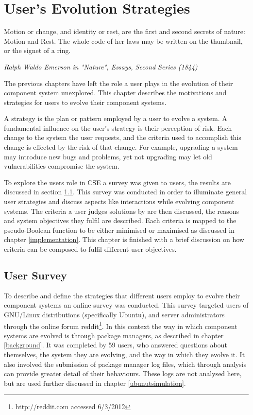 \chapter{User's Evolution Strategies}
\label{strategies}
\epigraph{Motion or change, and identity or rest, are the first and second secrets of nature: Motion and Rest. 
The whole code of her laws may be written on the thumbnail, or the signet of a ring.}
{\textit{Ralph Waldo Emerson in "Nature", Essays, Second Series (1844)}}
The previous chapters have left the role a user plays in the evolution of their component system unexplored.
This chapter describes the motivations and strategies for users to evolve their component systems.

A strategy is the plan or pattern employed by a user to evolve a system.
A fundamental influence on the user's strategy is their perception of risk.
Each change to the system the user requests, and the criteria used to accomplish this change is effected by the risk of that change.
For example, upgrading a system may introduce new bugs and problems, yet not upgrading may let old vulnerabilities compromise the system.

To explore the users role in CSE a survey was given to users, the results are discussed in section \ref{strat.usersurvey}.
This survey was conducted in order to illuminate general user strategies and discuss aspects like interactions while evolving component systems.
The criteria a user judges solutions by are then discussed, the reasons and system objectives they fulfil are described.
Each criteria is mapped to the pseudo-Boolean function to be either minimised or maximised as discussed in chapter \ref{implementation}.
This chapter is finished with a brief discussion on how criteria can be composed to fulfil different user objectives. 

\section{User Survey}
\label{strat.usersurvey}
To describe and define the strategies that different users employ to evolve their component systems an online survey was conducted.
This survey targeted users of GNU/Linux distributions (specifically Ubuntu), and server administrators through the online forum reddit\footnote{http://reddit.com accessed 6/3/2012}.
In this context the way in which component systems are evolved is through package managers, as described in chapter \ref{background}.
It was completed by 59 users, who answered questions about themselves, the system they are evolving, and the way in which they evolve it.
It also involved the submission of package manager log files, which through analysis can provide greater detail of their behaviours.
These logs are not analysed here, but are used further discussed in chapter \ref{ubunutsimulation}.

